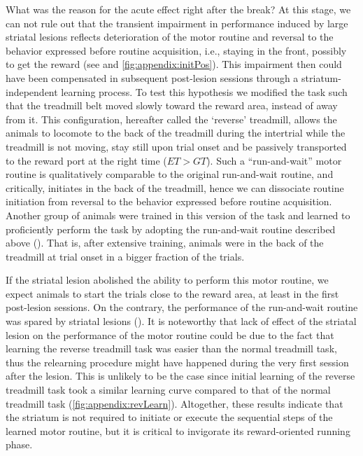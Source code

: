 What was the reason for the acute effect right after the break?
At this stage, we can not rule out that the transient impairment in performance induced by large striatal lesions reflects deterioration of the motor routine and reversal to the behavior expressed before routine acquisition, i.e., staying in the front, possibly to get the reward (see  and \autoref{fig:appendix:initPos}).
This impairment then could have been compensated in subsequent post-lesion sessions through a striatum-independent learning process.
To test this hypothesis we modified the task such that the treadmill belt moved slowly toward the reward area, instead of away from it.
This configuration, hereafter called the `reverse' treadmill, allows the animals to locomote to the back of the treadmill during the intertrial while the treadmill is not moving, stay still upon trial onset and be passively transported to the reward port at the right time ($ET>GT$).
Such a ``run-and-wait'' motor routine is qualitatively comparable to the original run-and-wait routine, and critically, initiates in the back of the treadmill, hence we can dissociate routine initiation from reversal to the behavior expressed before routine acquisition.
Another group of animals were trained in this version of the task and learned to proficiently perform the task by adopting the run-and-wait routine described above ().
That is, after extensive training, animals were in the back of the treadmill at trial onset in a bigger fraction of the trials.

If the striatal lesion abolished the ability to perform this motor routine, we expect animals to start the trials close to the reward area, at least in the first post-lesion sessions.
On the contrary, the performance of the run-and-wait routine was spared by striatal lesions ().
It is noteworthy that lack of effect of the striatal lesion on the performance of the motor routine could be due to the fact that learning the reverse treadmill task was easier than the normal treadmill task, thus the relearning procedure might have happened during the very first session after the lesion.
This is unlikely to be the case since initial learning of the reverse treadmill task took a similar learning curve compared to that of the normal treadmill task (\autoref{fig:appendix:revLearn}).
Altogether, these results indicate that the striatum is not required to initiate or execute the sequential steps of the learned motor routine, but it is critical to invigorate its reward-oriented running phase.


